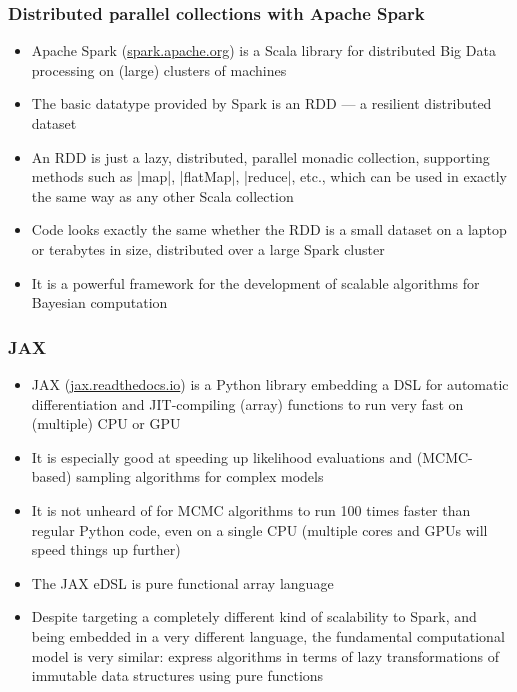 \documentclass[mathserif,handout]{beamer}
\begin{document}
\begin{frame}[fragile]
  \frametitle{Distributed parallel collections with Apache Spark}
  \begin{itemize}
  \item \alert{Apache Spark} (\url{spark.apache.org}) is a Scala library for distributed Big Data processing on (large) clusters of machines
  \item The basic datatype provided by Spark is an \alert{RDD} --- a resilient distributed dataset
  \item An RDD is just a \alert{lazy}, \alert{distributed}, parallel monadic collection, supporting methods such as |map|, |flatMap|, |reduce|, etc., which can be used in exactly the same way as any other Scala collection
  \item Code looks exactly the same whether the RDD is a small dataset on a laptop or terabytes in size, distributed over a large Spark cluster
    \item It is a powerful framework for the development of scalable algorithms for Bayesian computation
  \end{itemize}
\end{frame}

\begin{frame}
  \frametitle{JAX}
  \begin{itemize}
  \item \alert{JAX} (\url{jax.readthedocs.io}) is a Python library embedding a DSL for automatic differentiation and JIT-compiling (array) functions to run very fast on (multiple) CPU or GPU
  \item It is especially good at speeding up likelihood evaluations and (MCMC-based) sampling algorithms for complex models
  \item It is not unheard of for MCMC algorithms to run 100 times faster than regular Python code, even on a single CPU (multiple cores and GPUs will speed things up further)
  \item The JAX eDSL is \alert{pure functional array language}
    \item Despite targeting a completely different kind of scalability to Spark, and being embedded in a very different language, the fundamental computational model is very similar: \alert{express algorithms in terms of lazy transformations of immutable data structures using pure functions}
  \end{itemize}  
\end{frame}
\end{document}
